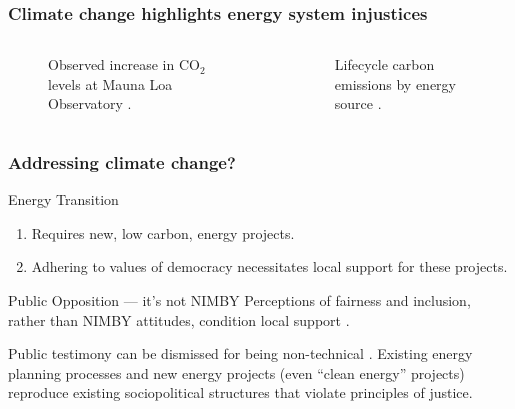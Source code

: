 \begin{frame}
    \frametitle{Climate change highlights energy system injustices}

    \begin{columns}
        \column[t]{5cm}
        \begin{figure}
            \centering
            \resizebox{\columnwidth}{!}{}            
            \caption{Observed increase in CO$_2$ levels at Mauna Loa Observatory
            \cite{kane_atmospheric_1996}.}
            \label{figure:mauna-loa}
        \end{figure}
        
        \column[t]{5cm}
        \begin{figure}
            \centering
            \resizebox{\columnwidth}{!}{}
            \caption{Lifecycle carbon emissions by energy source
            \cite{united_nations_economic_commission_for_europe_carbon_2022}.}
            \label{figure:energy-emissions}
        \end{figure}
    \end{columns}

\end{frame}

\begin{frame}
    \frametitle{Addressing climate change?}

        \begin{block}{Energy Transition}
            \begin{enumerate}
                \item Requires new, low carbon, energy projects.
                \item Adhering to values of democracy necessitates local support
                for these projects.
            \end{enumerate}
        \end{block}
        \begin{block}{Public Opposition --- it's not NIMBY}
            Perceptions of fairness and inclusion, rather than NIMBY attitudes,
            condition local support
            \cite{konisky_proximity_2021,aitken_why_2010,stokes_prevalence_2023,firestone_public_2012-1}.
        \end{block}
        \begin{block}{}
            Public testimony can be dismissed for being non-technical
            \cite{johnson_dakota_2021}. Existing energy planning processes and
            new energy projects (even ``clean energy'' projects) reproduce
            existing sociopolitical structures that violate principles of
            justice.
        \end{block}
\end{frame}

